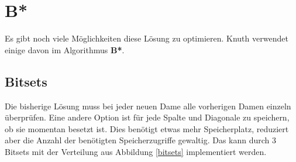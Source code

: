 \section{B*}
Es gibt noch viele Möglichkeiten diese Lösung zu optimieren. Knuth verwendet einige davon im Algorithmus \textbf{B*}\cite[p. 4]{TAOCP}.
\subsection{Bitsets}
Die bisherige Lösung muss bei jeder neuen Dame alle vorherigen Damen einzeln überprüfen. Eine 
andere Option ist für jede Spalte und Diagonale zu speichern, ob sie momentan besetzt ist. Dies benötigt etwas mehr Speicherplatz,
reduziert aber die Anzahl der benötigten Speicherzugriffe gewaltig. Das kann durch 3 Bitsets
mit der Verteilung aus Abbildung \ref{bitsets} implementiert werden.

